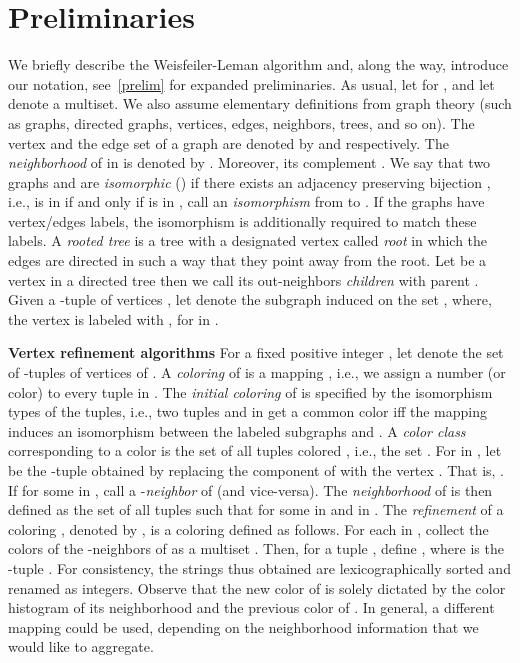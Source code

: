 \documentclass{article}
\newcommand{\xhdr}[1]{{\noindent\bfseries #1}}
\theoremstyle{definition}
\newcommand{\new}[1]{\emph{#1}}
\begin{document}
\section{Preliminaries}

We briefly describe the Weisfeiler-Leman algorithm and, along the way, introduce our notation, see~\cref{prelim} for expanded preliminaries. As usual, let  for , and let  denote a multiset. We also assume elementary definitions from graph theory (such as graphs, directed graphs, vertices, edges, neighbors,
trees, and so on). The vertex and the edge set of a graph  are denoted by  and  respectively. The \new{neighborhood} of  in  is denoted by . Moreover, its complement . We say that two graphs  and  are \new{isomorphic} () if there exists an adjacency preserving bijection , i.e.,  is in  if and only if 
 is in , call  an \emph{isomorphism} from  to . If the graphs have vertex/edges labels, the isomorphism is additionally required to match these labels. A \new{rooted tree} is a tree with a designated vertex called \new{root} in which the edges are directed in such a way that they point away from the root. Let  be a vertex in a directed tree then we call its out-neighbors \new{children} with parent . Given a -tuple of vertices , let  denote the subgraph induced on the set , where, the vertex  is labeled with , for  in . 


\xhdr{Vertex refinement algorithms}\label{vr}
For a fixed positive integer , let  denote the set of -tuples of vertices of . A \new{coloring} of  is a mapping , i.e., we assign a number (or color) to every tuple in . The \new{initial coloring}  of  is specified by the isomorphism types of the tuples, i.e., two tuples  and  in  get a common color iff the mapping  induces an isomorphism between the labeled subgraphs  and . A \new{color class} corresponding to a color  is the set of all tuples colored , i.e., the set . For  in , let  be the -tuple obtained by replacing the  component of  with the vertex . That is, . If  for some  in , call  a -\new{neighbor} of  (and vice-versa). The \emph{neighborhood} of  is then defined as the set of all tuples  such that  for some  in  and  in . The \emph{refinement} of a coloring , denoted by , is a coloring  defined as follows. 
For each  in , collect the colors of the -neighbors of  as a multiset .
Then, for a tuple , define , where  is the -tuple . For consistency, the strings  thus obtained are lexicographically sorted and renamed as integers. Observe that the new color  of  is solely dictated by the color histogram of its neighborhood and the previous color of . In general, a different mapping  could be used, depending on the neighborhood information that we would like to aggregate. 
\end{document}
